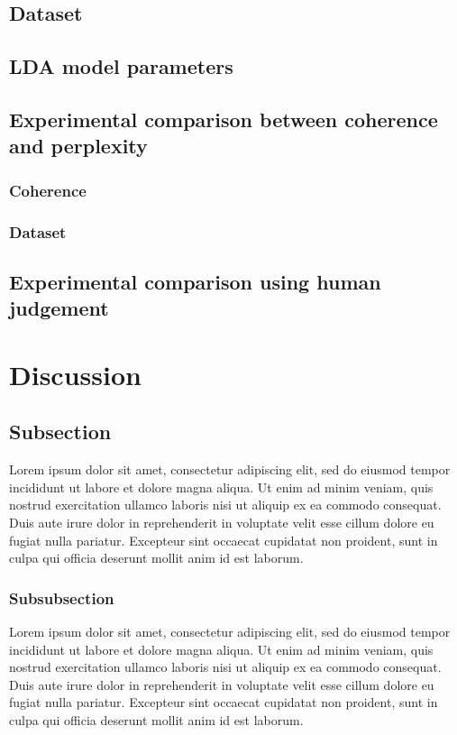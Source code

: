 \documentclass[twoside,11pt,a4paper]{article}
\begin{document}
\subsection{Dataset}

\subsection{LDA model parameters}

\subsection{Experimental comparison between coherence and perplexity}
\subsubsection{Coherence}
\subsubsection{Dataset}

\subsection{Experimental comparison using human judgement}

\clearpage
\section{Discussion}
\subsection{Subsection}
Lorem ipsum dolor sit amet, consectetur adipiscing elit, sed do eiusmod tempor incididunt ut labore et dolore magna aliqua. Ut enim ad minim veniam, quis nostrud exercitation ullamco laboris nisi ut aliquip ex ea commodo consequat. Duis aute irure dolor in reprehenderit in voluptate velit esse cillum dolore eu fugiat nulla pariatur. Excepteur sint occaecat cupidatat non proident, sunt in culpa qui officia deserunt mollit anim id est laborum.

\subsubsection{Subsubsection}
Lorem ipsum dolor sit amet, consectetur adipiscing elit, sed do eiusmod tempor incididunt ut labore et dolore magna aliqua. Ut enim ad minim veniam, quis nostrud exercitation ullamco laboris nisi ut aliquip ex ea commodo consequat. Duis aute irure dolor in reprehenderit in voluptate velit esse cillum dolore eu fugiat nulla pariatur. Excepteur sint occaecat cupidatat non proident, sunt in culpa qui officia deserunt mollit anim id est laborum.
\end{document}
